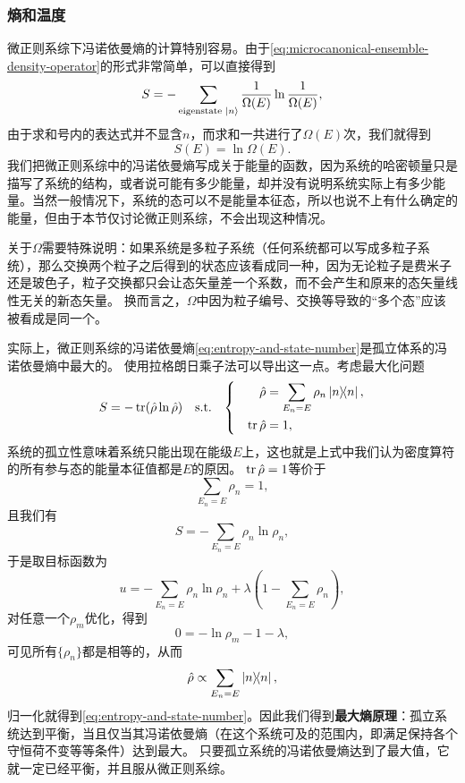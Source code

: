 \documentclass[hyperref, UTF8, a4paper]{ctexart}
\newenvironment{bigcase}{\left\{\quad\begin{aligned}}{\end{aligned}\right.}
\begin{document}
\subsubsection{熵和温度}\label{sec:entropy-and-temperature}

微正则系综下冯诺依曼熵的计算特别容易。由于\eqref{eq:microcanonical-ensemble-density-operator}的形式非常简单，可以直接得到
\[
    S = - \sum_\text{eigenstate $\ket{n}$} \frac{1}{\Omega(E)} \ln \frac{1}{\Omega(E)},
\]
由于求和号内的表达式并不显含$n$，而求和一共进行了$\Omega(E)$次，我们就得到
\begin{equation}
    S(E) = \ln \Omega(E).
    \label{eq:entropy-and-state-number}
\end{equation}
我们把微正则系综中的冯诺依曼熵写成关于能量的函数，因为系统的哈密顿量只是描写了系统的结构，或者说可能有多少能量，却并没有说明系统实际上有多少能量。当然一般情况下，系统的态可以不是能量本征态，所以也说不上有什么确定的能量，但由于本节仅讨论微正则系综，不会出现这种情况。

关于$\Omega$需要特殊说明：如果系统是多粒子系统（任何系统都可以写成多粒子系统），那么交换两个粒子之后得到的状态应该看成同一种，因为无论粒子是费米子还是玻色子，粒子交换都只会让态矢量差一个系数，而不会产生和原来的态矢量线性无关的新态矢量。
换而言之，$\Omega$中因为粒子编号、交换等导致的“多个态”应该被看成是同一个。

实际上，微正则系综的冯诺依曼熵\eqref{eq:entropy-and-state-number}是孤立体系的冯诺依曼熵中最大的。
使用拉格朗日乘子法可以导出这一点。考虑最大化问题
\[
    S = - \trace (\hat{\rho} \ln \hat{\rho}) \quad \text{s.t.} \quad \begin{bigcase}
        \hat{\rho} &= \sum_{E_n=E} \rho_n \dyad{n}, \\
        \trace \hat{\rho} &= 1,
    \end{bigcase}
\]
系统的孤立性意味着系统只能出现在能级$E$上，这也就是上式中我们认为密度算符的所有参与态的能量本征值都是$E$的原因。
$\trace \hat{\rho} = 1$等价于
\[
    \sum_{E_n=E} \rho_n = 1,
\]
且我们有
\[
    S = - \sum_{E_n=E} \rho_n \ln \rho_n,
\]
于是取目标函数为
\[
    u = - \sum_{E_n=E} \rho_n \ln \rho_n + \lambda \left(1 - \sum_{E_n=E} \rho_n\right),
\]
对任意一个$\rho_m$优化，得到
\[
    0 = - \ln \rho_m - 1 - \lambda,
\]
可见所有$\{\rho_n\}$都是相等的，从而
\[
    \hat{\rho} \propto \sum_{E_n=E} \dyad{n},
\]
归一化就得到\eqref{eq:entropy-and-state-number}。因此我们得到\textbf{最大熵原理}：孤立系统达到平衡，当且仅当其冯诺依曼熵（在这个系统可及的范围内，即满足保持各个守恒荷不变等等条件）达到最大。
只要孤立系统的冯诺依曼熵达到了最大值，它就一定已经平衡，并且服从微正则系综。
\end{document}
